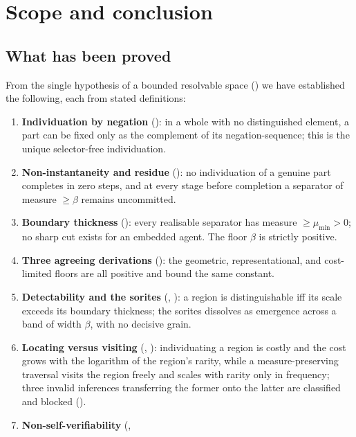 \documentclass[11pt,twocolumn,a4paper]{article}
\theoremstyle{thmstyle}
\theoremstyle{definition}
\theoremstyle{remark}
\newcommand{\thick}{\beta}
\begin{document}
\section{Scope and conclusion}
\label{sec:scope}

\subsection{What has been proved}

From the single hypothesis of a bounded resolvable space () we have
established the following, each from stated definitions:

\begin{enumerate}[label=(\arabic*),leftmargin=2.4em]
\item \textbf{Individuation by negation} (): in a whole
with no distinguished element, a part can be fixed only as the complement of its
negation-sequence; this is the unique selector-free individuation.
\item \textbf{Non-instantaneity and residue} (): no
individuation of a genuine part completes in zero steps, and at every stage before
completion a separator of measure $\ge\thick$ remains uncommitted.
\item \textbf{Boundary thickness} (): every realisable
separator has measure $\ge\mu_{\min}>0$; no sharp cut exists for an embedded
agent. The floor $\thick$ is strictly positive.
\item \textbf{Three agreeing derivations} (): the
geometric, representational, and cost-limited floors are all positive and bound
the same constant.
\item \textbf{Detectability and the sorites} (,
): a region is distinguishable iff its scale exceeds its
boundary thickness; the sorites dissolves as emergence across a band of width
$\thick$, with no decisive grain.
\item \textbf{Locating versus visiting} (,
): individuating a region is costly and the cost grows
with the logarithm of the region's rarity, while a measure-preserving traversal
visits the region freely and scales with rarity only in frequency; three invalid
inferences transferring the former onto the latter are classified and blocked
().
\item \textbf{Non-self-verifiability} (,

\end{enumerate}
\end{document}
